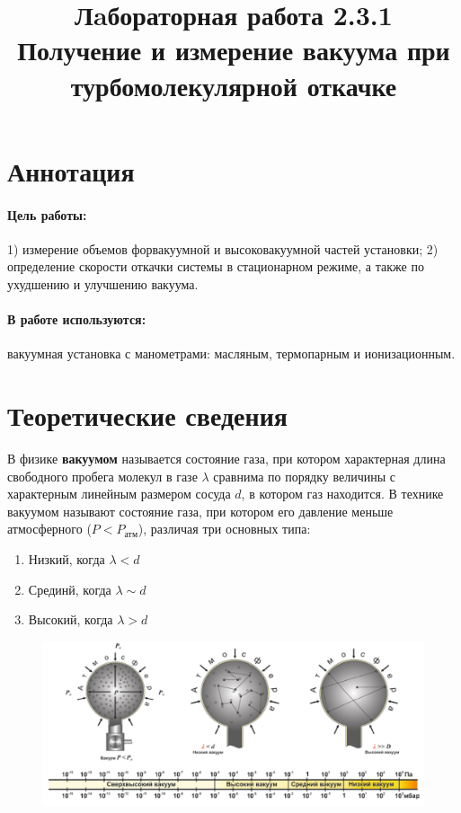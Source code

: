 \documentclass{article}
\date{}
\author{}
\title{Лaбораторная работа 2.3.1 \\ Получение и измерение вакуума при турбомолекулярной откачке}
\begin{document}
\maketitle

\section*{Аннотация}


\paragraph{Цель работы:} 1) измерение объемов форвакуумной и высоковакуумной частей установки; 2) определение скорости откачки системы в стационарном режиме, а также по ухудшению и улучшению вакуума.
\paragraph{В работе используются:} вакуумная установка с манометрами: масляным, термопарным и ионизационным.



\section*{Теоретические сведения}

В физике \textbf{вакуумом} называется состояние газа, при котором характерная длина свободного пробега молекул в газе $\lambda$ сравнима по порядку величины с характерным линейным размером сосуда $d$, в котором газ находится.
В технике вакуумом называют состояние газа, при котором его давление меньше атмосферного ($P < P_\text{атм}$), различая три основных типа:
\begin{enumerate}
    \item Низкий, когда $\lambda < d$
    \item Срединй, когда $\lambda \sim d$
    \item Высокий, когда $\lambda > d$
\end{enumerate}

\begin{figure}[h!]
    \centering
    \includegraphics[width=\textwidth]{pic1.png}
\end{figure}
\end{document}
